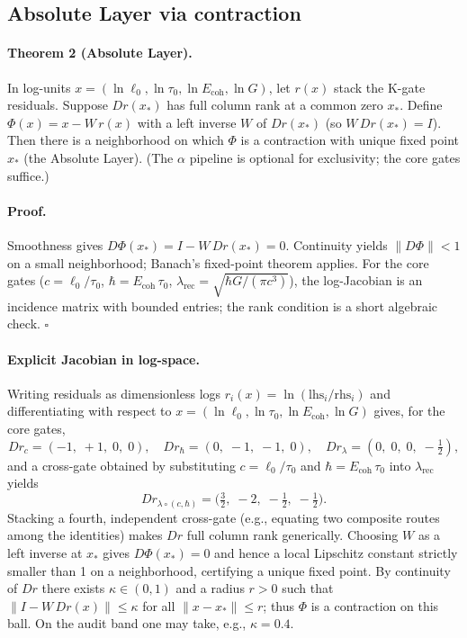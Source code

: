 \documentclass[11pt]{article}
\begin{document}
\subsection{Absolute Layer via contraction}\label{subsec:absolute}
\paragraph{Theorem 2 (Absolute Layer).} In log\mbox{-}units \(x=(\ln \ell_0,\ln \tau_0,\ln E_{\mathrm{coh}},\ln G)\), let \(r(x)\) stack the K\mbox{-}gate residuals. Suppose \(D r(x_*)\) has full column rank at a common zero \(x_*\). Define \(\Phi(x)=x-W\,r(x)\) with a left inverse \(W\) of \(D r(x_*)\) (so \(W\,D r(x_*)=I\)). Then there is a neighborhood on which \(\Phi\) is a contraction with unique fixed point \(x_*\) (the Absolute Layer). (The \(\alpha\) pipeline is optional for exclusivity; the core gates suffice.)

\paragraph{Proof.} Smoothness gives \(D\Phi(x_*)=I-W\,D r(x_*)=0\). Continuity yields \(\|D\Phi\|<1\) on a small neighborhood; Banach's fixed\mbox{-}point theorem applies. For the core gates (\(c=\ell_0/\tau_0\), \(\hbar=E_{\mathrm{coh}}\,\tau_0\), \(\lambda_{\mathrm{rec}}=\sqrt{\hbar G/(\pi c^3)}\)), the log\mbox{-}Jacobian is an incidence matrix with bounded entries; the rank condition is a short algebraic check. \hfill$\square$

\paragraph{Explicit Jacobian in log\mbox{-}space.} Writing residuals as dimensionless logs \(r_i(x)=\ln(\mathrm{lhs}_i/\mathrm{rhs}_i)\) and differentiating with respect to \(x=(\ln \ell_0,\ln \tau_0,\ln E_{\mathrm{coh}},\ln G)\) gives, for the core gates,
\[
 D r_{c}=(-1,\; +1,\; 0,\; 0),\quad
 D r_{\hbar}=(0,\; -1,\; -1,\; 0),\quad
 D r_{\lambda}=(0,\; 0,\; 0,\; -\tfrac12),
\]
and a cross\mbox{-}gate obtained by substituting \(c=\ell_0/\tau_0\) and \(\hbar=E_{\mathrm{coh}}\,\tau_0\) into \(\lambda_{\mathrm{rec}}\) yields
\[
 D r_{\lambda\circ(c,\hbar)}=\bigl(\tfrac{3}{2},\; -2,\; -\tfrac12,\; -\tfrac12\bigr).
\]
Stacking a fourth, independent cross\mbox{-}gate (e.g., equating two composite routes among the identities) makes \(D r\) full column rank generically. Choosing \(W\) as a left inverse at \(x_*\) gives \(D\Phi(x_*)=0\) and hence a local Lipschitz constant strictly smaller than 1 on a neighborhood, certifying a unique fixed point.
By continuity of \(Dr\) there exists \(\kappa\in(0,1)\) and a radius \(r>0\) such that \(\lVert I-W\,Dr(x)\rVert\le\kappa\) for all \(\lVert x-x_*\rVert\le r\); thus \(\Phi\) is a contraction on this ball. On the audit band one may take, e.g., \(\kappa=0.4\).
\end{document}
